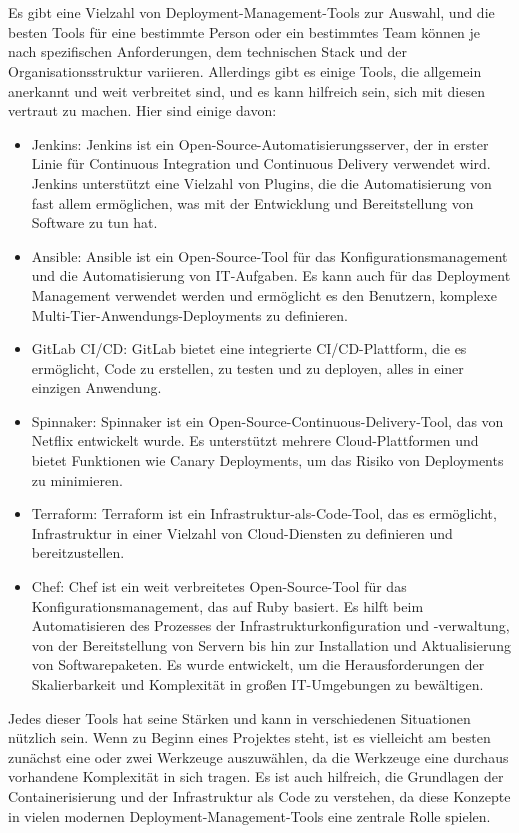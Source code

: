 \\\\
Es gibt eine Vielzahl von Deployment-Management-Tools zur Auswahl, und die besten Tools für eine bestimmte Person oder ein bestimmtes Team können je nach spezifischen Anforderungen, dem technischen Stack und der Organisationsstruktur variieren. Allerdings gibt es einige Tools, die allgemein anerkannt und weit verbreitet sind, und es kann hilfreich sein, sich mit diesen vertraut zu machen. Hier sind einige davon:
\begin{itemize} 
\item Jenkins: Jenkins ist ein Open-Source-Automatisierungsserver, der in erster Linie für Continuous Integration und Continuous Delivery verwendet wird. Jenkins unterstützt eine Vielzahl von Plugins, die die Automatisierung von fast allem ermöglichen, was mit der Entwicklung und Bereitstellung von Software zu tun hat.
\item Ansible: Ansible ist ein Open-Source-Tool für das Konfigurationsmanagement und die Automatisierung von IT-Aufgaben. Es kann auch für das Deployment Management verwendet werden und ermöglicht es den Benutzern, komplexe Multi-Tier-Anwendungs-Deployments zu definieren.
\item GitLab CI/CD: GitLab bietet eine integrierte CI/CD-Plattform, die es ermöglicht, Code zu erstellen, zu testen und zu deployen, alles in einer einzigen Anwendung.
\item Spinnaker: Spinnaker ist ein Open-Source-Continuous-Delivery-Tool, das von Netflix entwickelt wurde. Es unterstützt mehrere Cloud-Plattformen und bietet Funktionen wie Canary Deployments, um das Risiko von Deployments zu minimieren.
\item Terraform: Terraform ist ein Infrastruktur-als-Code-Tool, das es ermöglicht, Infrastruktur in einer Vielzahl von Cloud-Diensten zu definieren und bereitzustellen.
\item Chef: Chef ist ein weit verbreitetes Open-Source-Tool für das Konfigurationsmanagement, das auf Ruby basiert. Es hilft beim Automatisieren des Prozesses der Infrastrukturkonfiguration und -verwaltung, von der Bereitstellung von Servern bis hin zur Installation und Aktualisierung von Softwarepaketen. Es wurde entwickelt, um die Herausforderungen der Skalierbarkeit und Komplexität in großen IT-Umgebungen zu bewältigen.
\end{itemize} 
Jedes dieser Tools hat seine Stärken und kann in verschiedenen Situationen nützlich sein. Wenn zu Beginn eines Projektes steht, ist es vielleicht am besten zunächst eine oder zwei Werkzeuge auszuwählen, da die Werkzeuge eine durchaus vorhandene Komplexität in sich tragen. Es ist auch hilfreich, die Grundlagen der Containerisierung und der Infrastruktur als Code zu verstehen, da diese Konzepte in vielen modernen Deployment-Management-Tools eine zentrale Rolle spielen.

